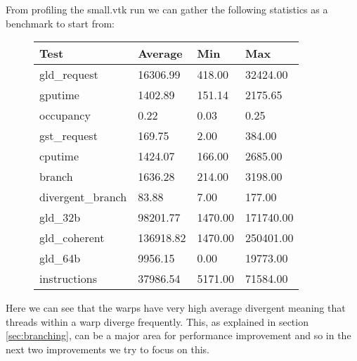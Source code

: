 From profiling the small.vtk run we can gather the following statistics as a benchmark to start from:\\
\begin{figure}[H]\centering \begin{tabular}{ l | l | l | l}
\hline
Test & Average & Min & Max \\
\hline
\hline
gld\_request & 16306.99 & 418.00 & 32424.00 \\
gputime & 1402.89 & 151.14 & 2175.65 \\
occupancy & 0.22 & 0.03 & 0.25 \\
gst\_request & 169.75 & 2.00 & 384.00 \\
cputime & 1424.07 & 166.00 & 2685.00 \\
branch & 1636.28 & 214.00 & 3198.00 \\
divergent\_branch & 83.88 & 7.00 & 177.00 \\
gld\_32b & 98201.77 & 1470.00 & 171740.00 \\
gld\_coherent & 136918.82 & 1470.00 & 250401.00 \\
gld\_64b & 9956.15 & 0.00 & 19773.00 \\
instructions & 37986.54 & 5171.00 & 71584.00 \\
\hline
\end{tabular} \end{figure}

Here we can see that the warps have very high average divergent meaning that threads within a warp diverge frequently. This, as explained in section \ref{sec:branching}, can be a major area for performance improvement and so in the next two improvements we try to focus on this.
